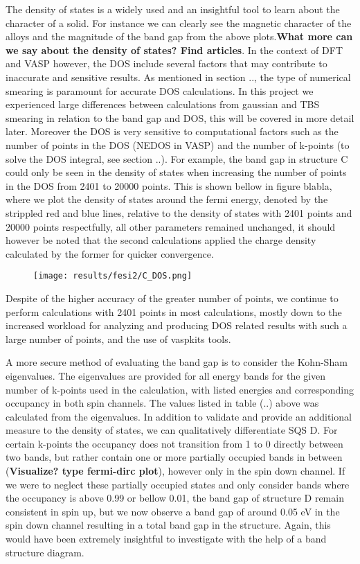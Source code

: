 The density of states is a widely used and an insightful tool to learn about the character of a solid. For instance we can clearly see the magnetic character of the alloys and the magnitude of the band gap from the above plots.\textbf{What more can we say about the density of states? Find articles}. In the context of DFT and VASP however, the DOS include several factors that may contribute to inaccurate and sensitive results. As mentioned in section .., the type of numerical smearing is paramount for accurate DOS calculations. In this project we experienced large differences between calculations from gaussian and TBS smearing in relation to the band gap and DOS, this will be covered in more detail later. Moreover the DOS is very sensitive to computational factors such as the number of points in the DOS (NEDOS in VASP) and the number of k-points (to solve the DOS integral, see section ..). For example, the band gap in structure C could only be seen in the density of states when increasing the number of points in the DOS from 2401 to 20000 points. This is shown bellow in figure blabla, where we plot the density of states around the fermi energy, denoted by the strippled red and blue lines, relative to the density of states with 2401 points and 20000 points respectfully, all other parameters remained unchanged, it should however be noted that the second calculations applied the charge density calculated by the former for quicker convergence. 

\begin{figure}[H]
\texttt{[image: results/fesi2/C\_DOS.png]}
\end{figure} 

Despite of the higher accuracy of the greater number of points, we continue to perform calculations with 2401 points in most calculations, mostly down to the increased workload for analyzing and producing DOS related results with such a large number of points, and the use of vaspkits tools. 
 
A more secure method of evaluating the band gap is to consider the Kohn-Sham eigenvalues. The eigenvalues are provided for all energy bands for the given number of k-points used in the calculation, with listed energies and corresponding occupancy in both spin channels. The values listed in table (..) above was calculated from the eigenvalues. In addition to validate and provide an additional measure to the density of states, we can qualitatively differentiate SQS D. For certain k-points the occupancy does not transition from 1 to 0 directly between two bands, but rather contain one or more partially occupied bands in between (\textbf{Visualize? type fermi-dirc plot}), however only in the spin down channel. If we were to neglect these partially occupied states and only consider bands where the occupancy is above 0.99 or bellow 0.01, the band gap of structure D remain consistent in spin up, but we now observe a band gap of around 0.05 eV in the spin down channel resulting in a total band gap in the structure. Again, this would have been extremely insightful to investigate with the help of a band structure diagram.

